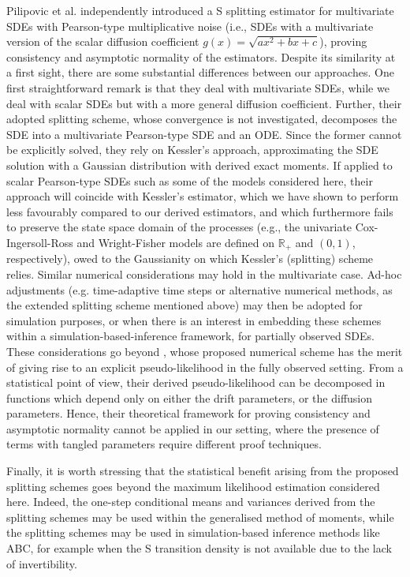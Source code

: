 \documentclass[a4paper,12pt]{article}
\numberwithin{equation}{section}
\theoremstyle{plain}
\theoremstyle{definition}
\begin{document}
Pilipovic et al. \cite[April 17, 2026]{pilipovic2026} independently introduced a S splitting estimator for multivariate SDEs with Pearson-type multiplicative noise (i.e., SDEs with a multivariate version of the scalar diffusion coefficient $g(x)=\sqrt{ax^2+b x+c}$), proving consistency and asymptotic normality of the estimators. Despite its similarity at a first sight, there are some substantial differences between our approaches. One first straightforward remark is that they deal with multivariate SDEs, while we deal with scalar SDEs but with a more general diffusion coefficient. Further, their adopted splitting scheme, whose convergence is not investigated, decomposes the SDE into a multivariate Pearson-type SDE and an ODE. Since the former cannot be explicitly solved, they rely on Kessler's approach, approximating the SDE solution with a Gaussian distribution
 with derived exact moments. 
If applied to scalar Pearson-type SDEs such as some of the models considered here, their approach will coincide with Kessler's estimator, which we have shown to perform less favourably compared to our derived estimators, and which furthermore fails to preserve 
 the state space domain of the processes (e.g., the univariate Cox-Ingersoll-Ross and Wright-Fisher models are defined on $\mathbb{R}_+$ and $(0,1)$, respectively), owed to
 the Gaussianity on which Kessler's (splitting) scheme relies. Similar numerical considerations may hold in the multivariate case. Ad-hoc adjustments (e.g. time-adaptive time steps or alternative numerical methods, as the extended splitting scheme mentioned above) may then be adopted for simulation purposes, or when there is an interest in embedding these schemes within a simulation-based-inference framework, for partially observed SDEs.  These considerations go beyond \cite{pilipovic2026}, whose proposed numerical scheme has the merit of giving rise to an explicit pseudo-likelihood in the fully observed setting. 
From a statistical point of view, their derived pseudo-likelihood can be decomposed in functions which depend only on either the drift parameters, or the diffusion parameters. Hence, their theoretical framework for proving consistency and asymptotic normality cannot be applied in our setting, where the presence of terms with tangled parameters require different proof techniques.

Finally, it is worth stressing that the statistical benefit arising from the proposed splitting schemes goes beyond the  maximum likelihood estimation considered here. Indeed, the one-step conditional means and variances derived from the splitting schemes may be used within the generalised method of moments, while the splitting schemes may be used in simulation-based inference methods like ABC, for example when the S transition density is not available due to the lack of invertibility.
\end{document}
